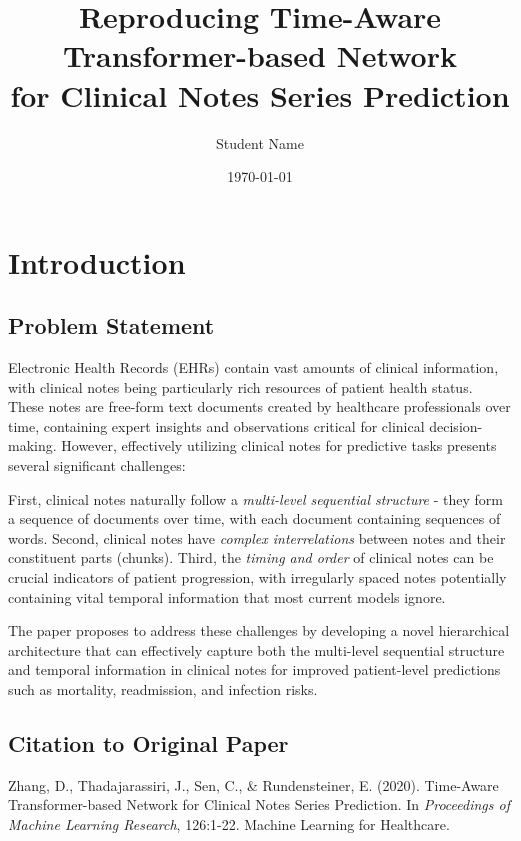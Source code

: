 \documentclass[10pt,letterpaper,twocolumn]{article}
\title{\textbf{Reproducing Time-Aware Transformer-based Network\\for Clinical Notes Series Prediction}}
\author{Student Name}
\date{\today}
\begin{document}
\twocolumn[
  \begin{@twocolumnfalse}
    \maketitle
    \thispagestyle{empty}
  \end{@twocolumnfalse}
]

\section{Introduction}

\subsection{Problem Statement}
Electronic Health Records (EHRs) contain vast amounts of clinical information, with clinical notes being particularly rich resources of patient health status. These notes are free-form text documents created by healthcare professionals over time, containing expert insights and observations critical for clinical decision-making. However, effectively utilizing clinical notes for predictive tasks presents several significant challenges:

First, clinical notes naturally follow a \textit{multi-level sequential structure} - they form a sequence of documents over time, with each document containing sequences of words. Second, clinical notes have \textit{complex interrelations} between notes and their constituent parts (chunks). Third, the \textit{timing and order} of clinical notes can be crucial indicators of patient progression, with irregularly spaced notes potentially containing vital temporal information that most current models ignore.

The paper proposes to address these challenges by developing a novel hierarchical architecture that can effectively capture both the multi-level sequential structure and temporal information in clinical notes for improved patient-level predictions such as mortality, readmission, and infection risks.

\subsection{Citation to Original Paper}
Zhang, D., Thadajarassiri, J., Sen, C., \& Rundensteiner, E. (2020). Time-Aware Transformer-based Network for Clinical Notes Series Prediction\cite{zhang2020time}. In \textit{Proceedings of Machine Learning Research}, 126:1-22. Machine Learning for Healthcare.
\end{document}
